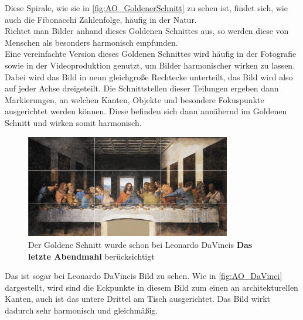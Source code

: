 Diese Spirale, wie sie in \autoref{fig:AO_GoldenerSchnitt} zu sehen ist, findet sich, wie auch die Fibonacchi Zahlenfolge, häufig in der Natur.\\
Richtet man Bilder anhand dieses Goldenen Schnittes aus, so werden diese von Menschen als besonders harmonisch empfunden.\autocite{Bruchwitz.2017}\\
Eine vereinfachte Version dieses Goldenen Schnittes wird häufig in der Fotografie sowie in der Videoproduktion genutzt, um Bilder harmonischer wirken zu lassen. Dabei wird das Bild in neun gleichgroße Rechtecke unterteilt, das Bild wird also auf jeder Achse dreigeteilt. Die Schnittstellen dieser Teilungen ergeben dann Markierungen, an welchen Kanten, Objekte und besondere Fokuspunkte ausgerichtet werden können. Diese befinden sich dann annähernd im Goldenen Schnitt und wirken somit harmonisch.\autocite{Bruchwitz.2017}\autocite{HollywoodLexicon.}

\begin{figure}[h]
    \centering
    \includegraphics[width=0.8\textwidth]{img/AO_DaVinci.jpg}
    \caption[Imagefilm: Das letzte Abendmahl]{Der Goldene Schnitt wurde schon bei Leonardo DaVincis \textbf{Das letzte Abendmahl} berücksichtigt}
    \label{fig:AO_DaVinci}
\end{figure}

Das ist sogar bei Leonardo DaVincis Bild zu sehen. Wie in \autoref{fig:AO_DaVinci} dargestellt, wird sind die Eckpunkte in diesem Bild zum einen an architekturellen Kanten, auch ist das untere Drittel am Tisch ausgerichtet. Das Bild wirkt dadurch sehr harmonisch und gleichmäßig. 
